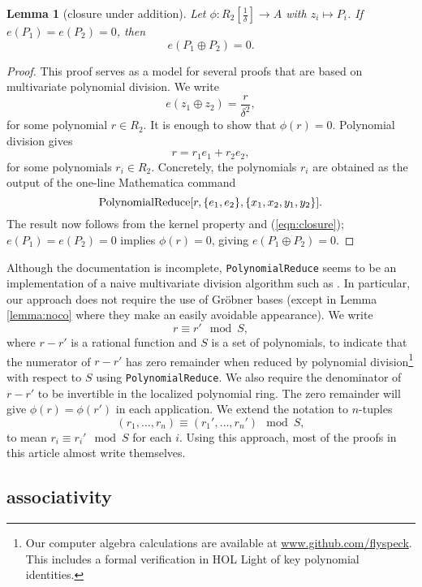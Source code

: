 \documentclass[12pt]{article}
\newtheorem{lemma}[theorem]{Lemma}
\newcommand{\op}[1]{\hbox{#1}}
\newcommand{\f}[1]{\frac{1}{#1}}
\begin{document}
\begin{lemma}[closure under addition]\label{lemma:closure}
  Let $\phi:R_2[\f{\delta}]\to A$ with $z_i\mapsto P_i$.
  If $e(P_1)=e(P_2)=0$, then
  \[
  e(P_1 \oplus P_2) = 0.
  \]
\end{lemma}

\begin{proof} This proof serves as a model for several proofs that are
  based on multivariate polynomial division.  We write
\[
e(z_1\oplus z_2) = \frac{r}{\delta^2},
\]
for some polynomial $r \in R_2$.  It is enough to show that
$\phi(r)=0$.  Polynomial division gives
\begin{equation}\label{eqn:closure}
r= r_1 e_1 + r_2 e_2,
\end{equation}
for some polynomials $r_i\in R_2$.  Concretely, the polynomials $r_i$
are obtained as the output of the one-line Mathematica command
\[
\op{PolynomialReduce}[r,\{e_1,e_2\},\{x_1,x_2,y_1,y_2\}].
\]
The result now follows from the kernel property and
(\ref{eqn:closure}); $ e(P_1) = e(P_2) = 0$ implies $\phi(r)= 0$,
giving ${e}(P_1\oplus P_2)=0$.
\end{proof}

Although the documentation is incomplete, {\tt PolynomialReduce} seems
to be an implementation of a naive multivariate division algorithm
such as \cite{cox1992ideals}.  In particular, our approach does not
require the use of Gr\"obner bases (except in Lemma \ref{lemma:noco}
where they make an easily avoidable appearance).  We write
\[
r \equiv r' \mod S,
\]
where $r-r'$ is a rational function and $S$ is a set of polynomials,
to indicate that the numerator of $r-r'$ has zero remainder when
reduced by polynomial division\footnote{Our computer algebra
  calculations are available at \url{www.github.com/flyspeck}.  This
  includes a formal verification in HOL Light of key polynomial
  identities.} with respect to $S$ using {\tt PolynomialReduce}.  We
also require the denominator of $r-r'$ to be invertible in the
localized polynomial ring.  The zero remainder will give $\phi(r)=\phi(r')$
in each application.  We extend the notation to $n$-tuples
\[
(r_1,\ldots,r_n) \equiv (r_1',\ldots,r_n') \mod S,
\]
to mean $r_i \equiv r_i' \mod S$ for each $i$.  Using this approach, most
of the proofs in this article almost write themselves.


\subsection{associativity}
\end{document}
